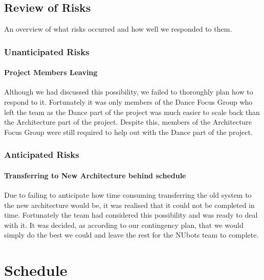 \documentclass[english,12pt]{scrartcl}
\begin{document}
		\subsection{Review of Risks}
			An overview of what risks occurred and how well we responded to them.
			\subsubsection{Unanticipated Risks}
				\paragraph{Project Members Leaving}  
					Although we had discussed this possibility, we failed to thoroughly plan how to respond to it. Fortunately it was only members of the Dance Focus Group who left the team as the Dance part of the project was much easier to scale back than the Architecture part of the project. Despite this, members of the Architecture Focus Group were still required to help out with the Dance part of the project.
			\subsubsection{Anticipated Risks}
				\paragraph{Transferring to New Architecture behind schedule}  
					Due to failing to anticipate how time consuming transferring the old system to the new architecture would be, it was realised that it could not be completed in time. Fortunately the team had considered this possibility and was ready to deal with it. It was decided, as according to our contingency plan, that we would simply do the best we could and leave the rest for the NUbots team to complete.

	\section{Schedule}
\end{document}
